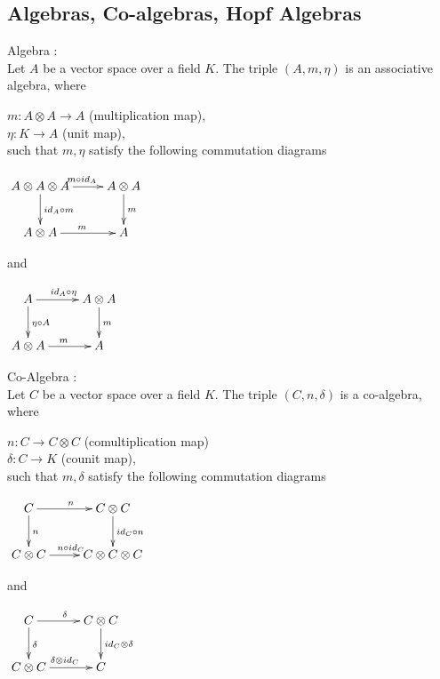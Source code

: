 \subsection{Algebras, Co-algebras, Hopf Algebras}
\begin{defn}
Algebra : \\
        Let $A$ be a vector space over a field $K$. The triple $(A, m, \eta)$ is an associative algebra, where

    $m : A \otimes A \rightarrow A$ (multiplication map), \\
    $\eta : K \rightarrow A$ (unit map),\\
such that $m, \eta$ satisfy the following commutation diagrams \\
\begin{center}
$\xymatrix{
A \otimes A \otimes A \ar[r]^{m \circ id_{A}} \ar[d]^{id_{A} \circ m} & A \otimes A \ar[d]^{m} \\
A \otimes A \ar[r]^{m}  & A 
}$
\end{center}
and \\
\begin{center}
$\xymatrix{
A \ar[r]^{id_{A} \circ \eta} \ar[d]^{\eta \circ A} & A \otimes A \ar[d]^{m} \\
A \otimes A \ar[r]^{m}  & A 
}$
\end{center} 
\end{defn}

\begin{defn}
Co-Algebra : \\
        Let $C$ be a vector space over a field $K$. The triple $(C, n, \delta)$ is a co-algebra, where

    $n : C \rightarrow C \otimes C$ (comultiplication map)\\
    $\delta : C \rightarrow K$ (counit map),\\
such that $m, \delta$ satisfy the following commutation diagrams \\
\begin{center}
$\xymatrix{
C \ar[r]^{n} \ar[d]^{n} & C \otimes C \ar[d]^{id_{C} \circ n} \\
C \otimes C \ar[r]^{n \circ id_{C}}  & C \otimes C \otimes C
}$
\end{center}
and \\
\begin{center}
$\xymatrix{
C \ar[r]^{\delta} \ar[d]^{\delta} & C \otimes C \ar[d]^{id_{C} \otimes \delta} \\
C \otimes C \ar[r]^{\delta \otimes id_{C}}  & C 
}$
\end{center} 
\end{defn}

